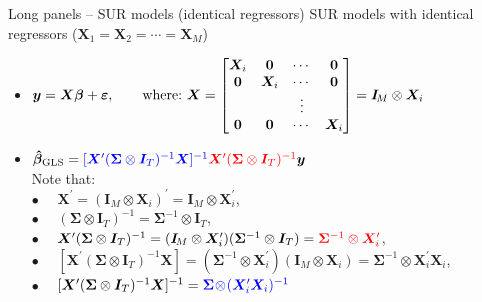 \documentclass[usenames,dvipsnames]{beamer}
\begin{document}
\begin{frame}{Long panels -- SUR models (identical regressors)}
\small
SUR models with identical regressors ($\bm{X}_1=\bm{X}_2=\cdots=\bm{X}_M$)\\ \bigskip
\begin{itemize}
    \item $\bm{y} = \bm{X\beta}+\bm{\varepsilon},\qquad \textnormal{where:~} \bm{X}=
    \begin{bmatrix} 
    \bm{X}_i & \bm{0} & \cdots & \bm{0} \\ 
    \bm{0} & \bm{X}_i & \cdots & \bm{0} \\ 
      &   & \vdots &  \\ 
    \bm{0} & \bm{0} & \cdots & \bm{X}_i \\ 
    \end{bmatrix} = \bm{I}_{\!M} \otimes \bm{X}_i$
    \bigskip
    \item $\bm{\hat{\beta}}_{\textnormal{GLS}} = \textcolor{blue}{[\bm{X}^{\prime} (\bm{\Sigma} \otimes \bm{I}_T)^{-1} \bm{X}]^{-1}} \textcolor{red}{\bm{X}^{\prime} (\bm{\Sigma} \otimes \bm{I}_T)^{-1}} \bm{y}$ \\ \medskip
    \quad Note that: \\ \smallskip
    \quad $\bullet$~~ $\bm{X}^{\prime} = (\bm{I}_{\!M} \otimes \bm{X}_i)^{\prime} = \bm{I}_{\!M} \otimes \bm{X}_i^{\prime}$,\\ \smallskip 
    \quad $\bullet$~~ $(\bm{\Sigma} \otimes \bm{I}_T)^{-1} = \bm{\Sigma}^{-1} \otimes \bm{I}_T$, \\ \smallskip
    \quad $\bullet$~~ $\bm{X}^{\prime} (\bm{\Sigma} \otimes \bm{I}_T)^{-1} = (\bm{I}_{\!M} \otimes \bm{X}_i^{\prime}) (\bm{\Sigma}^{-1} \otimes \bm{I}_T) = \textcolor{red}{\bm{\Sigma}^{-1} \otimes \bm{X}_i^{\prime}}$,\\ \smallskip 
    \quad $\bullet$~~ $[\bm{X}^{\prime} (\bm{\Sigma} \otimes \bm{I}_T)^{-1} \bm{X}] = (\bm{\Sigma}^{-1} \! \otimes \! \bm{X}_i^{\prime})(\bm{I}_{\!M} \! \otimes \! \bm{X}_i) = \bm{\Sigma}^{-1} \! \otimes \! \bm{X}_i^{\prime}\bm{X}_i $,\\ \smallskip
    \quad $\bullet$~~ $[\bm{X}^{\prime} (\bm{\Sigma} \otimes \bm{I}_T)^{-1} \bm{X}]^{-1} = \textcolor{blue}{\bm{\Sigma} \! \otimes \! (\bm{X}_i^{\prime}\bm{X}_i)^{-1}}$
\end{itemize}
\end{frame}
\end{document}
